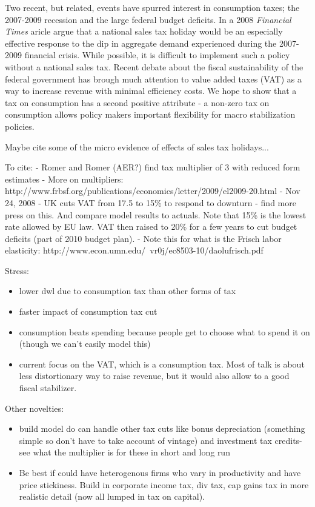 \documentclass[article,11pt,letterpaper,fleqn]{article}
\theoremstyle{definition}
\numberwithin{equation}{section}
\newcommand{\cn}{\citeasnoun} %
\begin{document}
Two recent, but related, events have spurred interest in consumption taxes; the 2007-2009 recession and the large federal budget deficits.  In a 2008 \emph{Financial Times} aricle \cn{LK_FT2008} argue that a national sales tax holiday would be an especially effective response to the dip in aggregate demand experienced during the 2007-2009 financial crisis.  While possible, it is difficult to implement such a policy without a national sales tax.  Recent debate about the fiscal sustainability of the federal government has brough much attention to value added taxes (VAT) as a way to increase revenue with minimal efficiency costs.  We hope to show that a tax on consumption has a second positive attribute - a non-zero tax on consumption allows policy makers important flexibility for macro stabilization policies.


Maybe cite some of the micro evidence of effects of sales tax holidays...

To cite:
- Romer and Romer (AER?) find tax multiplier of 3 with reduced form estimates
- More on multipliers: http://www.frbsf.org/publications/economics/letter/2009/el2009-20.html
- Nov 24, 2008 - UK cuts VAT from 17.5 to 15\% to respond to downturn - find more press on this.  And compare model results to actuals.  Note that 15\% is the lowest rate allowed by EU law.  VAT then raised to 20\% for a few years to cut budget deficits (part of 2010 budget plan).
- Note this for what is the Frisch labor elasticity: http://www.econ.umn.edu/~vr0j/ec8503-10/daolufrisch.pdf

Stress:
\begin{itemize}
\item lower dwl due to consumption tax than other forms of tax
\item faster impact of consumption tax cut
\item consumption beats spending because people get to choose what to spend it on (though we can't easily model this)
\item current focus on the VAT, which is a consumption tax.  Most of talk is about less distortionary way to raise revenue, but it would also allow to a good fiscal stabilizer.
\end{itemize}
Other novelties:
\begin{itemize}
\item build model do can handle other tax cuts like bonus depreciation (something simple so don't have to take account of vintage) and investment tax credits- see what the multiplier is for these in short and long run
\item Be best if could have heterogenous firms who vary in productivity and have price stickiness.  Build in corporate income tax, div tax, cap gains tax in more realistic detail (now all lumped in tax on capital).
\end{itemize}
\end{document}

